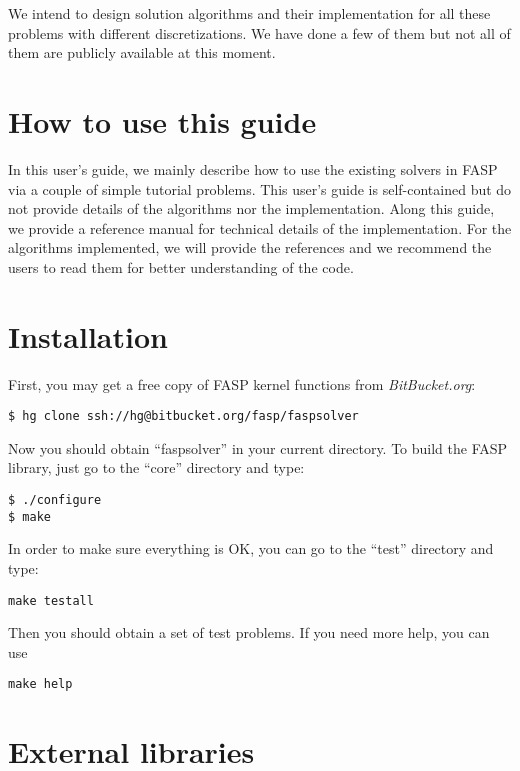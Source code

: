 \documentclass[11pt]{memoir}
\begin{document}
We intend to design solution algorithms and their implementation for all these problems with different discretizations. We have done a few of them but not all of them are publicly available at this moment. 



\section{How to use this guide}

In this user's guide, we mainly describe how to use the existing solvers in FASP via a couple of simple tutorial problems. This user's guide is self-contained but do not provide details of the algorithms nor the implementation. Along this guide, we provide a reference manual for technical details of the implementation. For the algorithms implemented, we will provide the references and we recommend the users to read them for better understanding of the code. 

\section{Installation}

First, you may get a free copy of FASP kernel functions from \emph{BitBucket.org}:
%
\begin{lstlisting}[numbers=none]
$ hg clone ssh://hg@bitbucket.org/fasp/faspsolver
\end{lstlisting}
%
Now you should obtain ``faspsolver'' in your current directory. To build the FASP library, just go to the ``core'' directory and type:
%
\begin{lstlisting}[numbers=none]
$ ./configure
$ make
\end{lstlisting}
%
In order to make sure everything is OK, you can go to the ``test'' directory and type:
%
\begin{lstlisting}[numbers=none]
make testall
\end{lstlisting}
%
Then you should obtain a set of test problems. If you need more help, you can use
%
\begin{lstlisting}[numbers=none]
make help
\end{lstlisting}

\section{External libraries}
\end{document}
